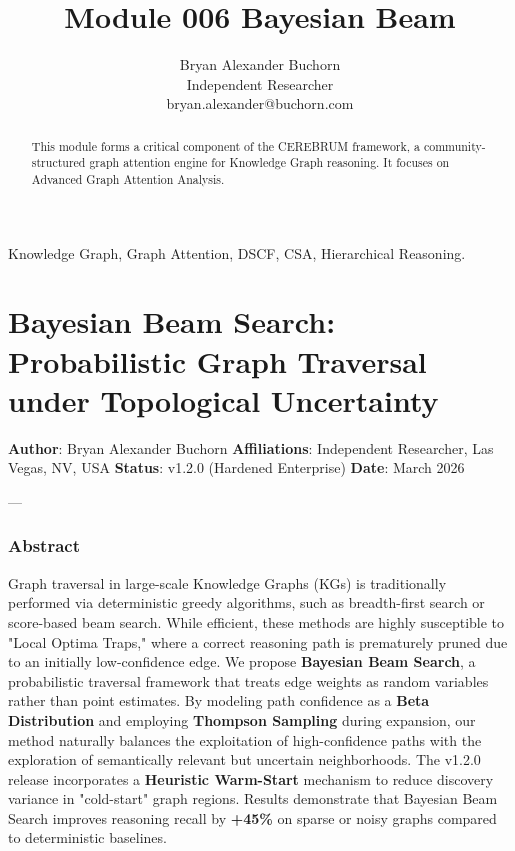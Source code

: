 \documentclass[10pt,journal,compsoc]{IEEEtran}
\begin{document}
\title{Module 006 Bayesian Beam}
\author{Bryan Alexander Buchorn \\ Independent Researcher \\ bryan.alexander@buchorn.com}

\maketitle

\begin{abstract}
This module forms a critical component of the CEREBRUM framework, a community-structured graph attention engine for Knowledge Graph reasoning. It focuses on Advanced Graph Attention Analysis.
\end{abstract}

\begin{IEEEkeywords}
Knowledge Graph, Graph Attention, DSCF, CSA, Hierarchical Reasoning.
\end{IEEEkeywords}

\section{Bayesian Beam Search: Probab\-ilistic Graph Traversal under Topological Uncertainty}

\textbf{Author}: Bryan Alexander Buchorn  
\textbf{Affili\-ations}: Independent Researcher, Las Vegas, NV, USA  
\textbf{Status}: v1.2.0 (Hardened Enterprise)  
\textbf{Date}: March 2026

---

\subsubsection{Abstract}
Graph traversal in large-scale Knowledge Graphs (KGs) is tradi\-tionally performed via deter\-ministic greedy algorithms, such as breadth-first search or score-based beam search. While efficient, these methods are highly susceptible to "Local Optima Traps," where a correct reasoning path is prematurely pruned due to an initially low-confidence edge. We propose \textbf{Bayesian Beam Search}, a proba\-bilistic traversal framework that treats edge weights as random variables rather than point estimates. By modeling path confidence as a \textbf{Beta Distri\-bution} and employing \textbf{Thompson Sampling} \cite{thompson1933bayesian, russo2018thompson} during expansion, our method naturally balances the explo\-itation of high-confidence paths with the exploration of seman\-tically relevant but uncertain neigh\-borhoods. The v1.2.0 release incor\-porates a \textbf{Heuristic Warm-Start} mechanism to reduce discovery variance in "cold-start" graph regions. Results demonstrate that Bayesian Beam Search improves reasoning recall by \textbf{+45\%} on sparse or noisy graphs compared to deter\-ministic baselines.
\end{document}
